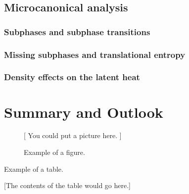 \documentclass[12pt]{report}
\begin{document}
\section{Microcanonical analysis}
\subsection{Subphases and subphase transitions}
\subsection{Missing subphases and translational entropy}
\subsection{Density effects on the latent heat}

\chapter{Summary and Outlook}










\begin{figure}
\centerline{[ You could put a picture here. ]}
\caption{Example of a figure.}
\end{figure}

\begin{table}
\caption{Example of a table.}
\centerline{[The contents of the table would go here.]}
\end{table}



\begin{thebibliography}{99}
        
\end{thebibliography}
\end{document}
